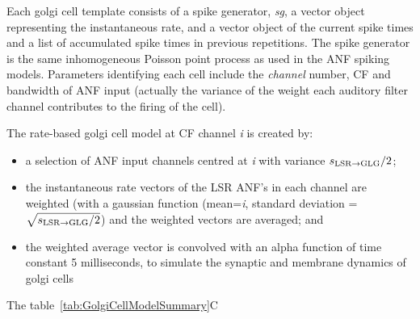 Each golgi cell template consists of a spike generator, \emph{sg}, a vector object representing the instantaneous rate, and a vector object of the current spike times and a list of accumulated spike times in previous repetitions.
The spike generator is the same inhomogeneous Poisson point process as used in the ANF spiking models.
Parameters identifying each cell include the \emph{channel} number, CF and bandwidth of ANF input (actually the variance of the weight each auditory filter channel contributes to the firing of the cell).

The rate-based golgi cell model at CF channel \emph{i} is created by:
\begin{itemize}
\item a selection of ANF input channels centred at \emph{i} with variance $\protect s_{\protect\textrm{{LSR}}\to\textrm{{GLG}}}/2$;
\item the instantaneous rate vectors of the LSR ANF's in each channel are weighted (with a gaussian function (mean=\emph{i}, standard deviation = $\sqrt{\protect s_{\protect\textrm{{LSR}}\to\textrm{{GLG}}}/2}$) and the weighted vectors are averaged; and
\item the weighted average vector is convolved with an alpha function of time constant 5 milliseconds, to simulate the synaptic and membrane dynamics of golgi cells
\end{itemize}
\noindent The table~\ref{tab:GolgiCellModelSummary}C







